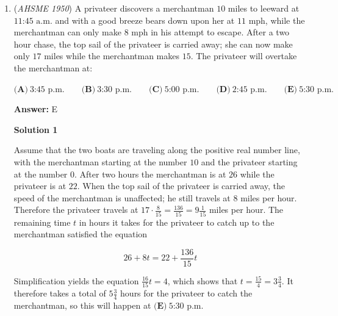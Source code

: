 \begin{enumerate}
 Thus, D) is valid because 
 \[\sqrt{(2a-b-b)^2+(2y_A-y_B-y_B)^2}=2\sqrt{(a-b)^2+(y_A-y_b)^2}=2AB=4.\]




\textbf{Solution 3 (Complex Numbers)}

Place $\triangle ABC$ in the complex plane such that $A = 0$ and $B = 2$.  Let $M$ the midpoint of $BC$.  Since $AM = 1.5$, the locus of $M$ is $1.5z$ over all $z$ such that $|z| = 1$.  Since $M = \frac{B+C}{2}$, $C = 2M-B = 3z-2$.  Therefore, the locus of $C$ is a circle of radius $3$ centered at $-2$, which is $4$ units from $B$ along $BA$, thus the answer is $\boxed{(\textbf{D})}$.

 -j314andrews

 


 


	\item (\textit{AHSME 1950}) A privateer discovers a merchantman $10$ miles to leeward at $11\text{:}45 \text{ a.m.}$ and with a good breeze bears down upon her at $11$ mph, while the merchantman can only make $8$ mph in his attempt to escape. After a two hour chase, the top sail of the privateer is carried away; she can now make only $17$ miles while the merchantman makes $15$. The privateer will overtake the merchantman at:


 $\textbf{(A)}\ 3\text{:}45\text{ p.m.}\qquad\textbf{(B)}\ 3\text{:}30\text{ p.m.}\qquad\textbf{(C)}\ 5\text{:}00\text{ p.m.}\qquad\textbf{(D)}\ 2\text{:}45\text{ p.m.}\qquad\textbf{(E)}\ 5\text{:}30\text{ p.m.}$

 \textbf{Answer: }E



\textbf{Solution 1}

Assume that the two boats are traveling along the positive real number line, with the merchantman starting at the number $10$ and the privateer starting at the number $0$. After two hours the merchantman is at $26$ while the privateer is at $22$. When the top sail of the privateer is carried away, the speed of the merchantman is unaffected; he still travels at $8$ miles per hour. Therefore the privateer travels at $17\cdot \frac{8}{15}=\frac{136}{15}=9\frac{1}{15}$ miles per hour. The remaining time $t$ in hours it takes for the privateer to catch up to the merchantman satisfied the equation

 
 \[26+8t=22+\frac{136}{15}t\]

 Simplification yields the equation $\frac{16}{15}t=4$, which shows that $t=\frac{15}{4}=3\frac{3}{4}$. It therefore takes a total of $5\frac{3}{4}$ hours for the privateer to catch the merchantman, so this will happen at $\boxed{\textbf{(E)}\ 5\text{:}30\text{ p.m.}}$





\end{enumerate}
